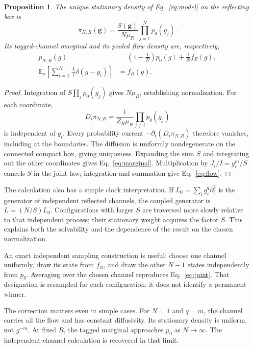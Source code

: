 \documentclass[11pt,a4paper]{article}
\newtheorem{proposition}{Proposition}
\newcommand{\E}{\mathbb{E}}
\begin{document}
\begin{proposition}
The unique stationary density of Eq.~\eqref{eq:model} on the reflecting box is
\begin{equation}
 \pi_{N,R}(\mathbf g)=\frac{S(\mathbf g)}{N\mu_R}
                 \prod_{j=1}^N p_0(g_j).
 \label{eq:joint}
\end{equation}
Its tagged-channel marginal and its pooled flow density are, respectively,
\begin{align}
 p_{N,R}(g)&=\left(1-\frac1N\right)p_0(g)+\frac1N f_R(g),
 \label{eq:marginal}\\
 \E_{\pi}\!\left[\sum_{i=1}^N\frac{J_i}{I}\delta(g-g_i)\right]&=f_R(g).
 \label{eq:flow}
\end{align}
\end{proposition}

\begin{proof}
Integration of $S\prod_j p_0(g_j)$ gives $N\mu_R$, establishing normalization.
For each coordinate,
\[
 D_i\pi_{N,R}=\frac{1}{Z_R\mu_R}\prod_{j\ne i}p_0(g_j)
\]
is independent of $g_i$. Every probability current
$-\partial_i(D_i\pi_{N,R})$ therefore vanishes, including at the boundaries.
The diffusion is uniformly nondegenerate on the connected compact box, giving
uniqueness. Expanding the sum $S$ and integrating out the other coordinates
gives Eq.~\eqref{eq:marginal}. Multiplication by $J_i/I=g_i^m/S$ cancels $S$
in the joint law; integration and summation give Eq.~\eqref{eq:flow}.
\end{proof}

The calculation also has a simple clock interpretation. If
$L_0=\sum_i g_i^q\partial_i^2$ is the generator of independent reflected
channels, the coupled generator is $L=(N/S)L_0$. Configurations with larger
$S$ are traversed more slowly relative to that independent process; their
stationary weight acquires the factor $S$. This explains both the solvability
and the dependence of the result on the chosen normalization.

An exact independent sampling construction is useful: choose one channel
uniformly, draw its state from $f_R$, and draw the other $N-1$ states independently
from $p_0$. Averaging over the chosen channel reproduces Eq.~\eqref{eq:joint}.
That designation is resampled for each configuration; it does not identify a
permanent winner.

The correction matters even in simple cases. For $N=1$ and $q=m$, the channel
carries all the flow and has constant diffusivity. Its stationary density is
uniform, not $g^{-m}$. At fixed $R$, the tagged marginal approaches $p_0$ as
$N\to\infty$. The independent-channel calculation is recovered in that limit.
\end{document}
